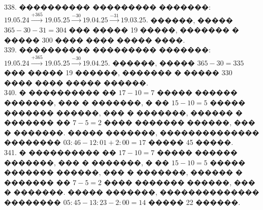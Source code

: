 \documentclass[12pt]{article}
\begin{document}
338. ���������� ��������� �������: $19.05.24\stackrel{+365}{\rightarrow}19.05.25\stackrel{-30}{\rightarrow}19.04.25
\stackrel{-31}{\rightarrow}19.03.25.$ ������, ����� $365-30-31=304$ ��� ����� 19 �����, ������� � ����� 300 ���� ���� ����� ����.\\
339. ���������� ��������� �������: $19.05.24\stackrel{+365}{\rightarrow}19.05.25\stackrel{-30}{\rightarrow}19.04.25.$ ������, ����� $365-30=335$ ��� ����� 19 ������, ������� � ����� 330 ���� ���� ����� ������.\\
340. � ���������� �� $17-10=7$ ����� ������ �������, ��� � �������, � �� $15-10=5$ ����� ������� ������, ��� � �������, ������ � ������� �� $7-5=2$ ���� ������� ������, ��� � �������. ����� �������, �������������� ��������
$03:46-12:01+2:00=17$ ����� 45 �����.\\
341. � ���������� �� $17-10=7$ ����� ������ �������, ��� � �������, � �� $15-10=5$ ����� ������� ������, ��� � �������, ������ � ������� �� $7-5=2$ ���� ������� ������, ��� � �������. ����� �������, �������������� ��������
$05:45-13:23-2:00=14$ ����� 22 ������.
\newpage
\end{document}
